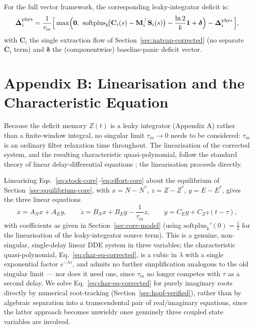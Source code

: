 \documentclass[twocolumn,10pt]{article}
\begin{document}
For the full vector framework, the corresponding leaky-integrator deficit is:
\[
\dot{\boldsymbol{\Delta}}_{i}^{\text{phys}} = \frac{1}{\tau_m}\Bigl[\,\max\Bigl(\mathbf 0,\ \text{softplus}_k\!\bigl( \mathbf{C}_i(s) - \mathbf{M}_i^\top \mathbf{S}_i(s) \bigr) - \frac{\ln 2}{k}\mathbf 1 + \boldsymbol\delta\Bigr) - \boldsymbol{\Delta}_i^{\text{phys}}\,\Bigr],
\]
with $\mathbf C_i$ the single extraction flow of Section~\ref{sec:natcap-corrected} (no separate $\bar{\mathbf C}_i$ term) and $\boldsymbol\delta$ the (componentwise) baseline-panic deficit vector.

\section{Appendix B: Linearisation and the Characteristic Equation}
Because the deficit memory $Z(t)$ is a leaky integrator (Appendix A) rather than a finite-window integral, no singular limit $\tau_m\to0$ needs to be considered: $\tau_m$ is an ordinary filter relaxation time throughout. The linearisation of the corrected system, and the resulting characteristic quasi-polynomial, follow the standard theory of linear delay-differential equations \cite{hale1993,diekmann1995}; the linearisation proceeds directly.

Linearising Eqs.~\eqref{eq:stock-core}--\eqref{eq:effort-core} about the equilibrium of Section~\ref{sec:equilibrium-core}, with $x=N-N^*$, $z=Z-Z^*$, $y=E-E^*$, gives the three linear equations
\[
\dot{x} = A_N x + A_E y, \qquad
\dot{z} = B_N x + B_E y - \frac{1}{\tau_m} z, \qquad
\dot{y} = C_E y + C_Z z(t-\tau),
\]
with coefficients as given in Section~\ref{sec:core-model} (using $\text{softplus}_k'(0)=\tfrac12$ for the linearisation of the leaky-integrator source term). This is a genuine, non-singular, single-delay linear DDE system in three variables; the characteristic quasi-polynomial, Eq.~\eqref{eq:char-eq-corrected}, is a cubic in $\lambda$ with a single exponential factor $e^{-\lambda\tau}$, and admits no further simplification analogous to the old singular limit — nor does it need one, since $\tau_m$ no longer competes with $\tau$ as a second delay. We solve Eq.~\eqref{eq:char-eq-corrected} for purely imaginary roots directly by numerical root-tracking (Section~\ref{sec:hopf-verified}), rather than by algebraic separation into a transcendental pair of real/imaginary equations, since the latter approach becomes unwieldy once genuinely three coupled state variables are involved.
\end{document}
